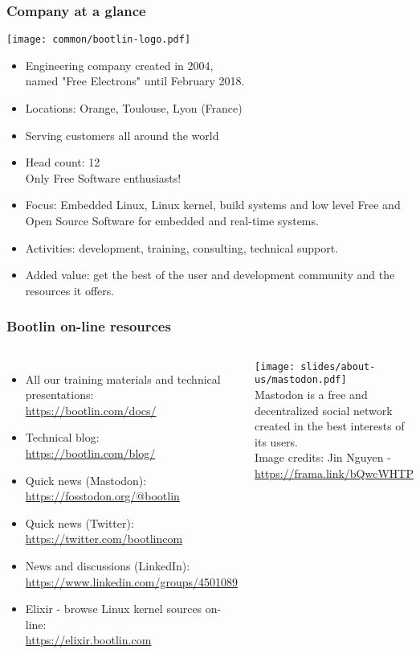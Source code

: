 \begin{frame}
\frametitle{Company at a glance}
  \texttt{[image: common/bootlin-logo.pdf]}
  \begin{itemize}
    \item Engineering company created in 2004,\\
          named "Free Electrons" until February 2018.
    \item Locations: Orange, Toulouse, Lyon (France)
    \item Serving customers all around the world
    \item Head count: 12 \\
	  Only Free Software enthusiasts!
    \item Focus: Embedded Linux, Linux kernel,
          build systems and low level Free and Open Source Software
          for embedded and real-time systems.
    \item Activities: development, training, consulting, technical
          support.
    \item Added value: get the best of the user and development
          community and the resources it offers.
  \end{itemize}
\end{frame}

\begin{frame}
\frametitle{Bootlin on-line resources}
\begin{columns}
  \begin{itemize}
    \item All our training materials and technical presentations:\\
          \url{https://bootlin.com/docs/}
    \item Technical blog:\\
          \url{https://bootlin.com/blog/}
    \item Quick news (Mastodon):\\
          \url{https://fosstodon.org/@bootlin}
    \item Quick news (Twitter):\\
          \url{https://twitter.com/bootlincom}
    \item News and discussions (LinkedIn):\\
	  \url{https://www.linkedin.com/groups/4501089}
    \item Elixir - browse Linux kernel sources on-line:\\
          \url{https://elixir.bootlin.com}
  \end{itemize}
  \texttt{[image: slides/about-us/mastodon.pdf]}\\
  \vspace{3cm}
  \small Mastodon is a free and decentralized social network created
  in the best interests of its users.\\
  \vspace{0.5cm}
  \tiny Image credits: Jin Nguyen - \url{https://frama.link/bQwcWHTP}
\end{columns}
\end{frame}
